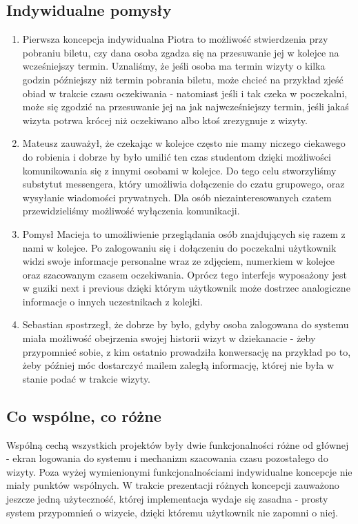 \documentclass[12pt]{article}
\begin{document}
\subsection {Indywidualne pomysły}
\begin {enumerate}
	\item Pierwsza koncepcja indywidualna Piotra to możliwość stwierdzenia przy pobraniu biletu, czy dana osoba zgadza się na przesuwanie jej w kolejce na wcześniejszy termin. Uznaliśmy, że jeśli osoba ma termin wizyty o kilka godzin późniejszy niż termin pobrania biletu, może chcieć na przykład zjeść obiad w trakcie czasu oczekiwania - natomiast jeśli i tak czeka w poczekalni, może się zgodzić na przesuwanie jej na jak najwcześniejszy termin, jeśli jakaś wizyta potrwa krócej niż oczekiwano albo ktoś zrezygnuje z wizyty.
	
	\item Mateusz zauważył, że czekając w kolejce często nie mamy niczego ciekawego do robienia i dobrze by było umilić ten czas studentom dzięki możliwości komunikowania się z innymi osobami w kolejce. Do tego celu stworzyliśmy substytut messengera, który umożliwia dołączenie do czatu grupowego, oraz wysyłanie wiadomości prywatnych. Dla osób niezainteresowanych czatem przewidzieliśmy możliwość wyłączenia komunikacji.
	
	\item Pomysł Macieja to umożliwienie przeglądania osób znajdujących się razem z nami w kolejce. Po zalogowaniu się i dołączeniu do poczekalni użytkownik widzi swoje informacje personalne wraz ze zdjęciem, numerkiem w kolejce oraz szacowanym czasem oczekiwania. Oprócz tego interfejs wyposażony jest w guziki next i previous dzięki którym użytkownik może dostrzec analogiczne informacje o innych uczestnikach z kolejki.
	
	\item Sebastian spostrzegł, że dobrze by było, gdyby osoba zalogowana do systemu miała możliwość obejrzenia swojej historii wizyt w dziekanacie - żeby przypomnieć sobie, z kim ostatnio prowadziła konwersację na przykład po to, żeby później móc dostarczyć mailem zaległą informację, której nie była w stanie podać w trakcie wizyty.

\end {enumerate}

\subsection {Co wspólne, co różne}
Wspólną cechą wszystkich projektów były dwie funkcjonalności różne od głównej - ekran logowania do systemu i mechanizm szacowania czasu pozostałego do wizyty. Poza wyżej wymienionymi funkcjonalnościami indywidualne koncepcje nie miały punktów wspólnych. W trakcie prezentacji różnych koncepcji zauważono jeszcze jedną użyteczność, której implementacja wydaje się zasadna - prosty system przypomnień o wizycie, dzięki któremu użytkownik nie zapomni o niej.
\end{document}

